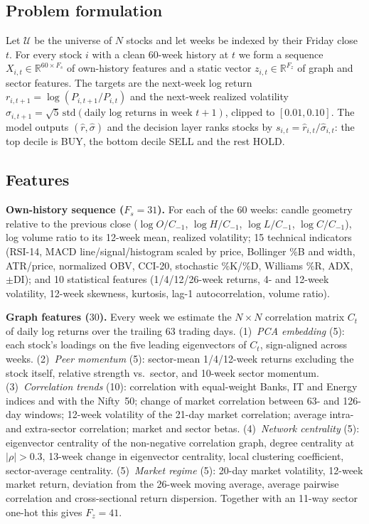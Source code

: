\documentclass[conference]{IEEEtran}
\begin{document}
\subsection{Problem formulation}
Let $\mathcal{U}$ be the universe of $N$ stocks and let weeks be indexed by their Friday close $t$. For every stock $i$ with a clean 60-week history at $t$ we form a sequence $X_{i,t}\in\mathbb{R}^{60\times F_s}$ of own-history features and a static vector $z_{i,t}\in\mathbb{R}^{F_z}$ of graph and sector features. The targets are the next-week log return $r_{i,t+1}=\log(P_{i,t+1}/P_{i,t})$ and the next-week realized volatility $\sigma_{i,t+1}=\sqrt{5}\,\mathrm{std}(\text{daily log returns in week }t{+}1)$, clipped to $[0.01,0.10]$. The model outputs $(\hat r,\hat\sigma)$ and the decision layer ranks stocks by $s_{i,t}=\hat r_{i,t}/\hat\sigma_{i,t}$: the top decile is BUY, the bottom decile SELL and the rest HOLD.

\subsection{Features}
\textbf{Own-history sequence ($F_s=31$).} For each of the 60 weeks: candle geometry relative to the previous close ($\log O/C_{-1}$, $\log H/C_{-1}$, $\log L/C_{-1}$, $\log C/C_{-1}$), log volume ratio to its 12-week mean, realized volatility; 15 technical indicators (RSI-14, MACD line/signal/histogram scaled by price, Bollinger \%B and width, ATR/price, normalized OBV, CCI-20, stochastic \%K/\%D, Williams \%R, ADX, $\pm$DI); and 10 statistical features (1/4/12/26-week returns, 4- and 12-week volatility, 12-week skewness, kurtosis, lag-1 autocorrelation, volume ratio).

\textbf{Graph features ($30$).} Every week we estimate the $N\times N$ correlation matrix $C_t$ of daily log returns over the trailing 63 trading days. (1)~\emph{PCA embedding} (5): each stock's loadings on the five leading eigenvectors of $C_t$, sign-aligned across weeks. (2)~\emph{Peer momentum} (5): sector-mean 1/4/12-week returns excluding the stock itself, relative strength vs.\ sector, and 10-week sector momentum. (3)~\emph{Correlation trends} (10): correlation with equal-weight Banks, IT and Energy indices and with the Nifty~50; change of market correlation between 63- and 126-day windows; 12-week volatility of the 21-day market correlation; average intra- and extra-sector correlation; market and sector betas. (4)~\emph{Network centrality} (5): eigenvector centrality of the non-negative correlation graph, degree centrality at $|\rho|>0.3$, 13-week change in eigenvector centrality, local clustering coefficient, sector-average centrality. (5)~\emph{Market regime} (5): 20-day market volatility, 12-week market return, deviation from the 26-week moving average, average pairwise correlation and cross-sectional return dispersion. Together with an 11-way sector one-hot this gives $F_z=41$.
\end{document}
